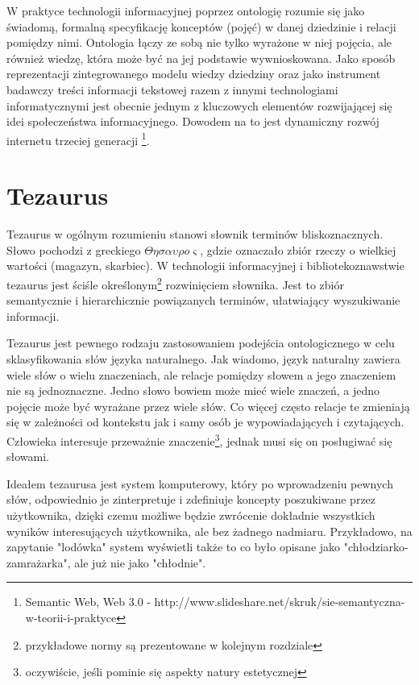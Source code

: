 \documentclass[12pt,a4paper,notitlepage]{article}
\begin{document}
W praktyce technologii informacyjnej poprzez ontologię rozumie się jako  świadomą, formalną 
specyfikację konceptów (pojęć) w danej dziedzinie i relacji pomiędzy nimi. Ontologia łączy ze sobą nie tylko wyrażone w niej pojęcia, ale również wiedzę, która może być na jej podstawie wywnioskowana. Jako sposób reprezentacji zintegrowanego  modelu wiedzy dziedziny oraz jako instrument badawczy treści informacji tekstowej razem z innymi technologiami informatycznymi jest obecnie jednym z kluczowych elementów 
rozwijającej się idei społeczeństwa informacyjnego. Dowodem na to jest dynamiczny rozwój internetu trzeciej generacji \footnote{Semantic Web, Web 3.0 - http://www.slideshare.net/skruk/sie-semantyczna-w-teorii-i-praktyce}. 
 
\section{Tezaurus}
Tezaurus w ogólnym rozumieniu stanowi słownik terminów bliskoznacznych. Słowo pochodzi z greckiego $\Theta \eta \sigma \alpha \upsilon \rho o \varsigma$, gdzie oznaczało zbiór rzeczy o wielkiej wartości (magazyn, skarbiec). W technologii informacyjnej i bibliotekoznawstwie tezaurus jest ściśle określonym\footnote{przykładowe normy są prezentowane w kolejnym rozdziale}  rozwinięciem słownika. Jest to zbiór semantycznie i hierarchicznie powiązanych terminów, ułatwiający wyszukiwanie informacji. 

Tezaurus jest pewnego rodzaju zastosowaniem podejścia ontologicznego w celu sklasyfikowania słów języka naturalnego. Jak wiadomo, język naturalny zawiera wiele słów o wielu znaczeniach, ale relacje pomiędzy słowem a jego znaczeniem nie są jednoznaczne. Jedno słowo bowiem może mieć wiele znaczeń, a jedno pojęcie może być wyrażane przez wiele słów. Co więcej często relacje te zmieniają się w zależności od kontekstu jak i samy osób je wypowiadających i czytających. Człowieka interesuje przeważnie znaczenie\footnote{oczywiście, jeśli pominie się aspekty natury estetycznej}, jednak musi się on posługiwać się słowami. 

Ideałem tezaurusa jest system komputerowy, który po wprowadzeniu pewnych słów, odpowiednio je zinterpretuje i zdefiniuje koncepty poszukiwane przez użytkownika, dzięki czemu możliwe będzie zwrócenie dokładnie wszystkich wyników interesujących użytkownika, ale bez żadnego nadmiaru. Przykładowo, na zapytanie "lodówka" system wyświetli także to co było opisane jako "chłodziarko-zamrażarka", ale już nie jako "chłodnie". 
\end{document}
